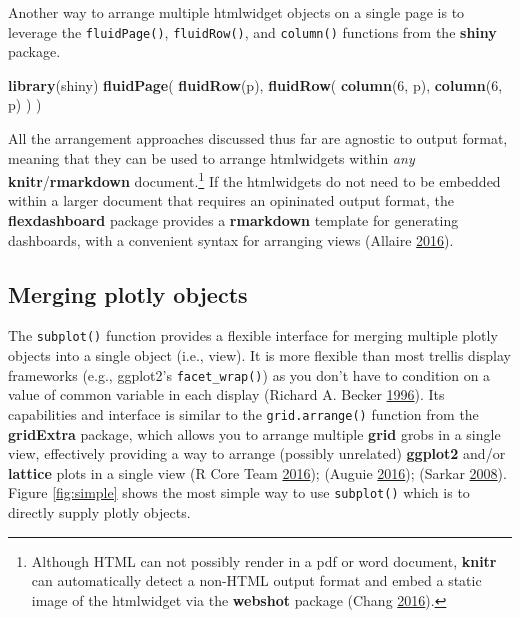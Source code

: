 \documentclass[12pt,]{isuthesis}
\newenvironment{Shaded}{\begin{snugshade}}{\end{snugshade}}
\newcommand{\KeywordTok}[1]{\textcolor[rgb]{0.13,0.29,0.53}{\textbf{{#1}}}}
\newcommand{\DecValTok}[1]{\textcolor[rgb]{0.00,0.00,0.81}{{#1}}}
\newcommand{\NormalTok}[1]{{#1}}
\let\rmarkdownfootnote\footnote%
\def\footnote{\protect\rmarkdownfootnote}
\begin{document}
\hypertarget{htmlwidget-4594e0b0e617dfac29ab}{}

\hypertarget{htmlwidget-bee521fa7689171c1db1}{}

Another way to arrange multiple htmlwidget objects on a single page is
to leverage the \texttt{fluidPage()}, \texttt{fluidRow()}, and
\texttt{column()} functions from the \textbf{shiny} package.

\begin{Shaded}
\begin{Highlighting}[]
\KeywordTok{library}\NormalTok{(shiny)}
\KeywordTok{fluidPage}\NormalTok{(}
  \KeywordTok{fluidRow}\NormalTok{(p),}
  \KeywordTok{fluidRow}\NormalTok{(}
    \KeywordTok{column}\NormalTok{(}\DecValTok{6}\NormalTok{, p), }\KeywordTok{column}\NormalTok{(}\DecValTok{6}\NormalTok{, p) }
  \NormalTok{)}
\NormalTok{)}
\end{Highlighting}
\end{Shaded}

\hypertarget{htmlwidget-d14752dc5c19068b58ee}{}

\hypertarget{htmlwidget-1bff36fa5d7ee67de63c}{}

\hypertarget{htmlwidget-d41546d26799e68ae6b9}{}

All the arrangement approaches discussed thus far are agnostic to output
format, meaning that they can be used to arrange htmlwidgets within
\emph{any} \textbf{knitr}/\textbf{rmarkdown} document.\footnote{Although
  HTML can not possibly render in a pdf or word document, \textbf{knitr}
  can automatically detect a non-HTML output format and embed a static
  image of the htmlwidget via the \textbf{webshot} package (Chang
  \protect\hyperlink{ref-webshot}{2016}).} If the htmlwidgets do not
need to be embedded within a larger document that requires an opininated
output format, the \textbf{flexdashboard} package provides a
\textbf{rmarkdown} template for generating dashboards, with a convenient
syntax for arranging views (Allaire
\protect\hyperlink{ref-flexdashboard}{2016}).

\subsection{Merging plotly objects}\label{merging-plotly-objects}

The \texttt{subplot()} function provides a flexible interface for
merging multiple plotly objects into a single object (i.e., view). It is
more flexible than most trellis display frameworks (e.g., ggplot2's
\texttt{facet\_wrap()}) as you don't have to condition on a value of
common variable in each display (Richard A. Becker
\protect\hyperlink{ref-trellis}{1996}). Its capabilities and interface
is similar to the \texttt{grid.arrange()} function from the
\textbf{gridExtra} package, which allows you to arrange multiple
\textbf{grid} grobs in a single view, effectively providing a way to
arrange (possibly unrelated) \textbf{ggplot2} and/or \textbf{lattice}
plots in a single view (R Core Team \protect\hyperlink{ref-base}{2016});
(Auguie \protect\hyperlink{ref-gridExtra}{2016}); (Sarkar
\protect\hyperlink{ref-lattice}{2008}). Figure \ref{fig:simple} shows
the most simple way to use \texttt{subplot()} which is to directly
supply plotly objects.
\end{document}
